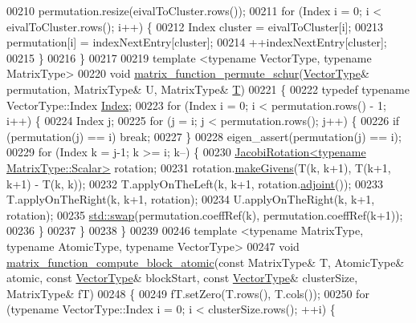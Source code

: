 \begin{DoxyCode}
00210   permutation.resize(eivalToCluster.rows());
00211   \textcolor{keywordflow}{for} (Index i = 0; i < eivalToCluster.rows(); i++) \{
00212     Index cluster = eivalToCluster[i];
00213     permutation[i] = indexNextEntry[cluster];
00214     ++indexNextEntry[cluster];
00215   \}
00216 \}  
00217 
00219 \textcolor{keyword}{template} <\textcolor{keyword}{typename} VectorType, \textcolor{keyword}{typename} MatrixType>
00220 \textcolor{keywordtype}{void} \hyperlink{namespace_eigen_1_1internal_a59cacdc2f9b480da246258bc9399aa2c}{matrix\_function\_permute\_schur}(\hyperlink{struct_vector_type}{VectorType}& permutation, 
      MatrixType& U, MatrixType& \hyperlink{group___sparse_core___module}{T})
00221 \{
00222   \textcolor{keyword}{typedef} \textcolor{keyword}{typename} VectorType::Index \hyperlink{namespace_eigen_a62e77e0933482dafde8fe197d9a2cfde}{Index};
00223   \textcolor{keywordflow}{for} (Index i = 0; i < permutation.rows() - 1; i++) \{
00224     Index j;
00225     \textcolor{keywordflow}{for} (j = i; j < permutation.rows(); j++) \{
00226       \textcolor{keywordflow}{if} (permutation(j) == i) \textcolor{keywordflow}{break};
00227     \}
00228     eigen\_assert(permutation(j) == i);
00229     \textcolor{keywordflow}{for} (Index k = j-1; k >= i; k--) \{
00230       \hyperlink{group___jacobi___module_class_eigen_1_1_jacobi_rotation}{JacobiRotation<typename MatrixType::Scalar>} rotation;
00231       rotation.\hyperlink{group___jacobi___module_af73c81e9cc139b7e0d877ce553b02ec0}{makeGivens}(T(k, k+1), T(k+1, k+1) - T(k, k));
00232       T.applyOnTheLeft(k, k+1, rotation.\hyperlink{group___jacobi___module_a89c8ea615f8fa77ddd5810a1e5fde4da}{adjoint}());
00233       T.applyOnTheRight(k, k+1, rotation);
00234       U.applyOnTheRight(k, k+1, rotation);
00235       \hyperlink{endian_8c_a3ca5ecd34b04d6a243c054ac3a57f68d}{std::swap}(permutation.coeffRef(k), permutation.coeffRef(k+1));
00236     \}
00237   \}
00238 \}
00239 
00246 \textcolor{keyword}{template} <\textcolor{keyword}{typename} MatrixType, \textcolor{keyword}{typename} AtomicType, \textcolor{keyword}{typename} VectorType>
00247 \textcolor{keywordtype}{void} \hyperlink{namespace_eigen_1_1internal_a53e617df189868a791e44d2c4e94403f}{matrix\_function\_compute\_block\_atomic}(\textcolor{keyword}{const} MatrixType& T, 
      AtomicType& atomic, \textcolor{keyword}{const} \hyperlink{struct_vector_type}{VectorType}& blockStart, \textcolor{keyword}{const} \hyperlink{struct_vector_type}{VectorType}& clusterSize, MatrixType& fT)
00248 \{ 
00249   fT.setZero(T.rows(), T.cols());
00250   \textcolor{keywordflow}{for} (\textcolor{keyword}{typename} VectorType::Index i = 0; i < clusterSize.rows(); ++i) \{

\end{DoxyCode}
